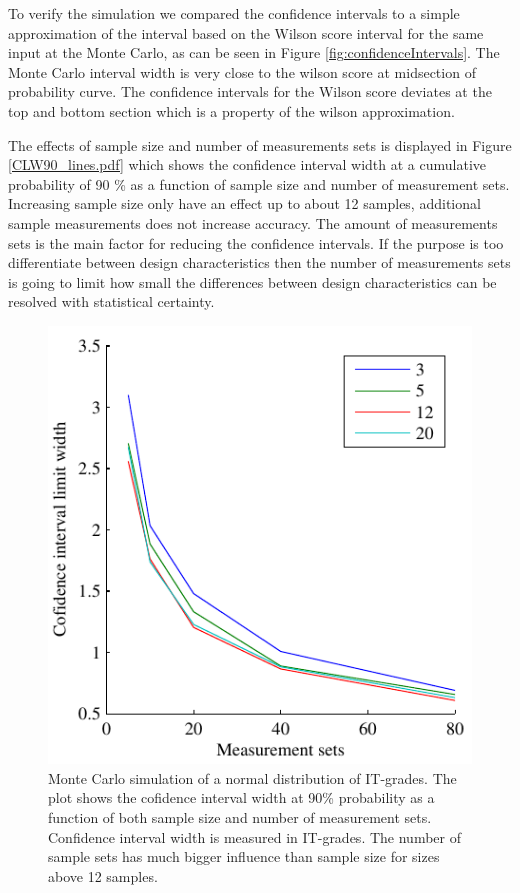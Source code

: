 \documentclass[aip,amsmath, reprint, author-year]{revtex4-1}
\begin{document}
To verify the simulation we compared the confidence intervals to a simple approximation of the interval based on the Wilson score interval for the same input at the Monte Carlo, as can be seen in Figure \ref{fig:confidenceIntervals}. The Monte Carlo interval width is very close to the wilson score at midsection of probability curve. 
The confidence intervals for the Wilson score deviates at the top and bottom section which is a property of the wilson approximation.

The effects of sample size and number of measurements sets is displayed in Figure \ref{CLW90_lines.pdf} which shows the confidence interval width at a cumulative probability of 90 \% as a function of sample size and number of measurement sets. 
Increasing sample size only have an effect up to about 12 samples, additional sample measurements does not increase accuracy. 
The amount of measurements sets is the main factor for reducing the confidence intervals. 
If the purpose is too differentiate between design characteristics then the number of measurements sets is going to limit how small the differences between design characteristics can be resolved with statistical certainty.

\begin{figure}
\includegraphics{CLW90_lines.pdf}
\caption{\label{fig:cl_line} Monte Carlo simulation of a normal distribution of IT-grades. The plot shows the cofidence interval width at 90\% probability as a function of both sample size and number of measurement sets. 
Confidence interval width is measured in IT-grades. 
The number of sample sets has much bigger influence than sample size for sizes above 12 samples.}
\end{figure}
\end{document}
